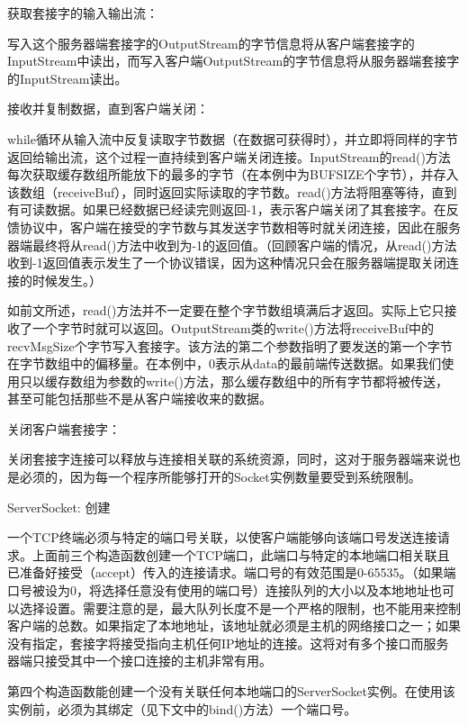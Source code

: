 		获取套接字的输入输出流：

		写入这个服务器端套接字的OutputStream的字节信息将从客户端套接字的InputStream中读出，而写入客户端OutputStream的字节信息将从服务器端套接字的InputStream读出。

		接收并复制数据，直到客户端关闭：

		while循环从输入流中反复读取字节数据（在数据可获得时），并立即将同样的字节返回给输出流，这个过程一直持续到客户端关闭连接。InputStream的read()方法每次获取缓存数组所能放下的最多的字节（在本例中为BUFSIZE个字节），并存入该数组（receiveBuf），同时返回实际读取的字节数。read()方法将阻塞等待，直到有可读数据。如果已经数据已经读完则返回-1，表示客户端关闭了其套接字。在反馈协议中，客户端在接受的字节数与其发送字节数相等时就关闭连接，因此在服务器端最终将从read()方法中收到为-1的返回值。（回顾客户端的情况，从read()方法收到-1返回值表示发生了一个协议错误，因为这种情况只会在服务器端提取关闭连接的时候发生。）

		如前文所述，read()方法并不一定要在整个字节数组填满后才返回。实际上它只接收了一个字节时就可以返回。OutputStream类的write()方法将receiveBuf中的recvMsgSize个字节写入套接字。该方法的第二个参数指明了要发送的第一个字节在字节数组中的偏移量。在本例中，0表示从data的最前端传送数据。如果我们使用只以缓存数组为参数的write()方法，那么缓存数组中的所有字节都将被传送，甚至可能包括那些不是从客户端接收来的数据。

		关闭客户端套接字：

		关闭套接字连接可以释放与连接相关联的系统资源，同时，这对于服务器端来说也是必须的，因为每一个程序所能够打开的Socket实例数量要受到系统限制。

		ServerSocket: 创建	

		

		一个TCP终端必须与特定的端口号关联，以使客户端能够向该端口号发送连接请求。上面前三个构造函数创建一个TCP端口，此端口与特定的本地端口相关联且已准备好接受（accept）传入的连接请求。端口号的有效范围是0-65535。（如果端口号被设为0，将选择任意没有使用的端口号）连接队列的大小以及本地地址也可以选择设置。需要注意的是，最大队列长度不是一个严格的限制，也不能用来控制客户端的总数。如果指定了本地地址，该地址就必须是主机的网络接口之一；如果没有指定，套接字将接受指向主机任何IP地址的连接。这将对有多个接口而服务器端只接受其中一个接口连接的主机非常有用。

		第四个构造函数能创建一个没有关联任何本地端口的ServerSocket实例。在使用该实例前，必须为其绑定（见下文中的bind()方法）一个端口号。

